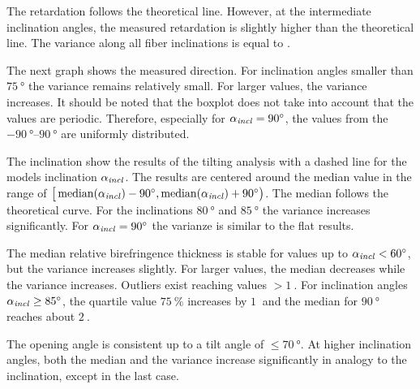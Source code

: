 The retardation follows the theoretical line.
However, at the intermediate inclination angles, the measured retardation is slightly higher than the theoretical line.
The variance along all fiber inclinations is equal to \modelInc{}.
\par
%
The next graph shows the measured direction.
For inclination angles smaller than $\SI{75}{\degree}$ the variance remains relatively small.
For larger values, the variance increases.
It should be noted that the boxplot does not take into account that the values are periodic.
Therefore, especially for $\textnormal{$\alpha_{\mathit{incl}}$}=\SI{90}{\degree}$, the values from the $\SIrange{-90}{90}{\degree}$ are uniformly distributed.
\par
%
The inclination show the results of the tilting analysis with a dashed line for the models inclination $\textnormal{$\alpha_{\mathit{incl}}$}$.
The results are centered around the median value in the range of $\big[\operatorname{median} (\textnormal{$\alpha_{\mathit{incl}}$})-\SI{90}{\degree}, \operatorname{median}(\textnormal{$\alpha_{\mathit{incl}}$})+\SI{90}{\degree}\big)$.
The median follows the theoretical curve.
For the inclinations $\SI{80}{\degree}$ and $\SI{85}{\degree}$ the variance increases significantly.
For $\textnormal{$\alpha_{\mathit{incl}}$} = \SI{90}{\degree}$ the varianze is similar to the flat results.
\par
%
The median relative birefringence thickness \trel{} is stable for values up to $\textnormal{$\alpha_{\mathit{incl}}$} < \SI{60}{\degree}$, but the variance increases slightly.
For larger values, the median decreases while the variance increases.
Outliers exist reaching values $>\SI{1}{}$.
For inclination angles $\textnormal{$\alpha_{\mathit{incl}}$} \ge \SI{85}{\degree}$, the quartile value $\SI{75}{\percent}$ increases by $\SI{1}{}$ and the median for $\SI{90}{\degree}$ reaches about $\SI{2}{}$.
\par
%
The opening angle \openingAngle{} is consistent up to a tilt angle of $\le \SI{70}{\degree}$.
At higher inclination angles, both the median and the variance increase significantly in analogy to the inclination, except in the last case.
%
%
%
